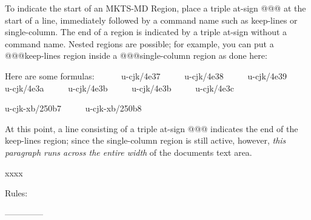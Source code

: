 



To indicate the start of an MKTS-MD Region, place a triple at-sign {\mktsFontSourcecodeproregular{}@@@}
at the start of a line, immediately followed by a command name such as
{\mktsFontSourcecodeproregular{}keep-lines} or {\mktsFontSourcecodeproregular{}single-column}. The end of a region is indicated by a
triple at-sign without a command name. Nested regions are possible; for example,
\null\newpage{}you can put a {\mktsFontSourcecodeproregular{}@@@keep-lines} region inside a {\mktsFontSourcecodeproregular{}@@@single-column} region as
done here:\par

Here are some formulas:
\begingroup{}     
{\mktsFontSourcecodeproregular{}u-cjk/4e37}     
{\mktsFontSourcecodeproregular{}u-cjk/4e38}     
{\mktsFontSourcecodeproregular{}u-cjk/4e39}     
{\mktsFontSourcecodeproregular{}u-cjk/4e3a}     
{\mktsFontSourcecodeproregular{}u-cjk/4e3b}     
{\mktsFontSourcecodeproregular{}u-cjk/4e3b}     
{\mktsFontSourcecodeproregular{}u-cjk/4e3c}     \par

{\mktsFontSourcecodeproregular{}u-cjk-xb/250b7}     
{\mktsFontSourcecodeproregular{}u-cjk-xb/250b8}     \par

\endgroup{}\par

At this point, a line consisting of a triple at-sign {\mktsFontSourcecodeproregular{}@@@}
indicates the end of the {\mktsFontSourcecodeproregular{}keep-lines} region; since the
{\mktsFontSourcecodeproregular{}single-column} region is still active, however, \textit{this
paragraph runs across the entire width} of the documents text
area.\par

xxxx\par

\par

Rules:\par
--------------


